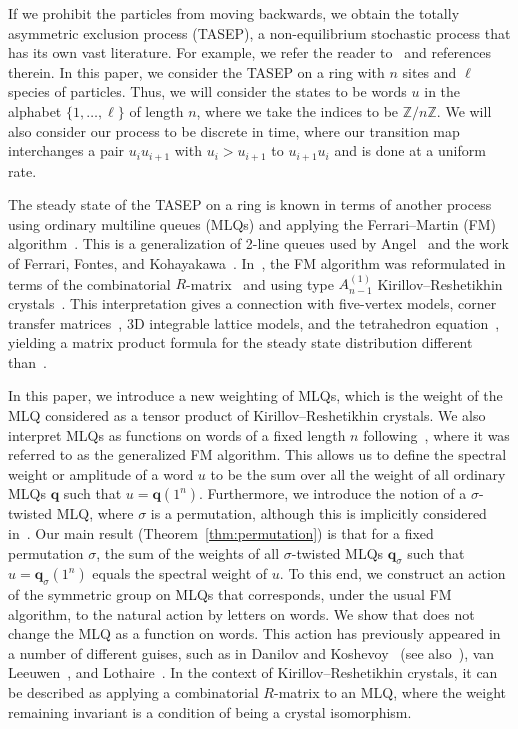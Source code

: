 \documentclass[reqno]{amsart}
\newcommand{\0}{\phantom{c}}
\newcommand{\qq}{\mathbf{q}}
\newcommand{\ZZ}{\mathbb{Z}}
\theoremstyle{plain}
\theoremstyle{definition}
\numberwithin{equation}{section}
\begin{document}
If we prohibit the particles from moving backwards, we obtain the totally asymmetric exclusion process (TASEP), a non-equilibrium stochastic process that has its own vast literature.
For example, we refer the reader to~\cite{AasLin17,AAMP,BE07,BP14,DEHP93,KMO15,KMO16,Liggett99} and references therein.
In this paper, we consider the TASEP on a ring with $n$ sites and $\ell$ species of particles.
Thus, we will consider the states to be words $u$ in the alphabet $\{1, \dotsc, \ell\}$ of length $n$, where we take the indices to be $\ZZ / n \ZZ$.
We will also consider our process to be discrete in time, where our transition map interchanges a pair $u_i u_{i+1}$ with $u_i > u_{i+1}$ to $u_{i+1} u_i$ and is done at a uniform rate.

The steady state of the TASEP on a ring is known in terms of another process using ordinary multiline queues (MLQs) and applying the Ferrari--Martin (FM) algorithm~\cite{FM06,FM07}.
This is a generalization of 2-line queues used by Angel~\cite{Angel06} and the work of Ferrari, Fontes, and Kohayakawa~\cite{FFK94}.
In~\cite{KMO15,KMO16}, the FM algorithm was reformulated in terms of the combinatorial $R$-matrix~\cite{NY97,Shimozono02} and using type $A_{n-1}^{(1)}$ Kirillov--Reshetikhin crystals~\cite{KKMMNN92}.
This interpretation gives a connection with five-vertex models, corner transfer matrices~\cite{Baxter89}, 3D integrable lattice models, and the tetrahedron equation~\cite{Zam80}, yielding a matrix product formula for the steady state distribution different than~\cite{CdGW15,EFM09,PEM09}.

In this paper, we introduce a new weighting of MLQs, which is the weight of the MLQ considered as a tensor product of Kirillov--Reshetikhin crystals.
We also interpret MLQs as functions on words of a fixed length $n$ following~\cite{AAMP}, where it was referred to as the generalized FM algorithm.
This allows us to define the spectral weight or amplitude of a word $u$ to be the sum over all the weight of all ordinary MLQs $\qq$ such that $u = \qq(1^n)$.
Furthermore, we introduce the notion of a $\sigma$-twisted MLQ, where $\sigma$ is a permutation, although this is implicitly considered in~\cite{AAMP}.
Our main result (Theorem~\ref{thm:permutation}) is that for a fixed permutation $\sigma$, the sum of the weights of all $\sigma$-twisted MLQs $\qq_{\sigma}$ such that $u = \qq_{\sigma}(1^n)$ equals the spectral weight of $u$.
To this end, we construct an action of the symmetric group on MLQs that corresponds, under the usual FM algorithm, to the natural action by letters on words.
We show that does not change the MLQ as a function on words.
This action has previously appeared in a number of different guises, such as in Danilov and Koshevoy~\cite{DanilovKoshevoy} (see also~\cite[Ch.~4]{Gorodentsev2}), van Leeuwen~\cite[Lemma~2.3]{vanLeeuwen-dc}, and Lothaire~\cite[Ch.~5, (5.6.3)]{Loth}.
In the context of Kirillov--Reshetikhin crystals, it can be described as applying a combinatorial $R$-matrix to an MLQ, where the weight remaining invariant is a condition of being a crystal isomorphism.
\end{document}
